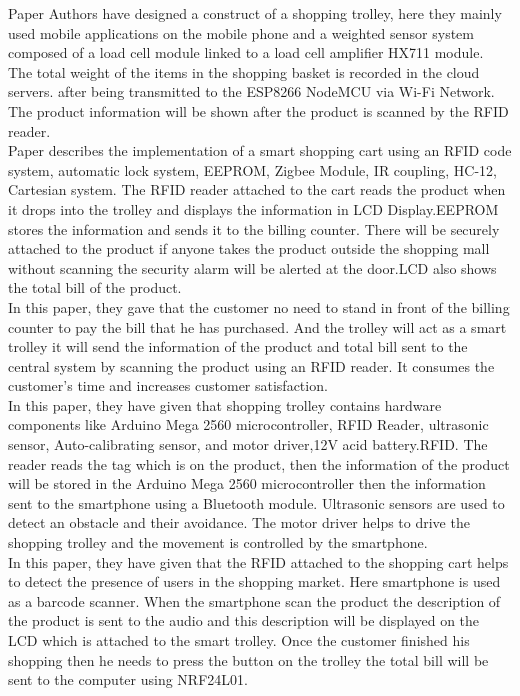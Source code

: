 \documentclass[conference]{IEEEtran}
\begin{document}
Paper\cite{b16} Authors have designed a construct of a shopping trolley, here they mainly used mobile applications on the mobile phone and a weighted sensor system composed of a load cell module linked to a load cell amplifier HX711 module. The total weight of the items in the shopping basket is recorded in the cloud servers. after being transmitted to the ESP8266 NodeMCU via Wi-Fi Network. The product information will be shown after the product is scanned by the RFID reader.\\


Paper\cite{b17} describes the implementation of a smart shopping cart using an RFID code system, automatic lock system, EEPROM, Zigbee Module, IR coupling, HC-12, Cartesian system. The RFID reader attached to the cart reads the product when it drops into the trolley and displays the information in LCD Display.EEPROM stores the information and sends it to the billing counter. There will be securely attached to the product if anyone takes the product outside the shopping mall without scanning the security alarm will be alerted at the door.LCD also shows the total bill of the product.\\





In this paper\cite{b18}, they gave that the customer no need to stand in front of the billing counter to pay the bill that he has purchased. And the trolley will act as a smart trolley it will send the information of the product and total bill sent to the central system by scanning the product using an RFID reader. It consumes the customer’s time and increases customer satisfaction.\\

In this paper\cite{b19}, they have given that shopping trolley contains hardware components like Arduino Mega 2560 microcontroller, RFID Reader, ultrasonic sensor, Auto-calibrating sensor, and motor driver,12V acid battery.RFID. The reader reads the tag which is on the product, then the information of the product will be stored in the Arduino Mega 2560 microcontroller then the information sent to the smartphone using a Bluetooth module. Ultrasonic sensors are used to detect an obstacle and their avoidance. The motor driver helps to drive the shopping trolley and the movement is controlled by the smartphone.\\

In this paper\cite{b20}, they have given that the RFID attached to the shopping cart helps to detect the presence of users in the shopping market. Here smartphone is used as a barcode scanner. When the smartphone scan the product the description of the product is sent to the audio and this description will be displayed on the LCD which is attached to the smart trolley. Once the customer finished his shopping then he needs to press the button on the trolley the total bill will be sent to the computer using NRF24L01.\\
\end{document}
